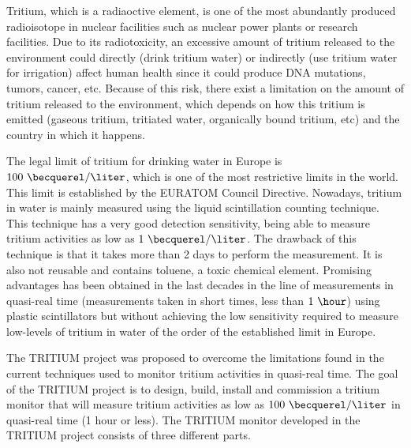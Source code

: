 Tritium, which is a radiaoctive element, is one of the most abundantly produced radioisotope in nuclear facilities such as nuclear power plants or research facilities. Due to its radiotoxicity, an excessive amount of tritium released to the environment could directly (drink tritium water) or indirectly (use tritium water for irrigation) affect human health since it could produce DNA mutations, tumors, cancer, etc. Because of this risk, there exist a limitation on the amount of tritium released to the environment, which depends on how this tritium is emitted (gaseous tritium, tritiated water, organically bound tritium, etc) and the country in which it happens.

The legal limit of tritium for drinking water in Europe is $100~\becquerel/\liter$, which is one of the most restrictive limits in the world. This limit is established by the EURATOM Council Directive. Nowadays, tritium in water is mainly measured using the liquid scintillation counting technique. This technique has a very good detection sensitivity, being able to measure tritium activities as low as $1~\becquerel/\liter$. The drawback of this technique is that it takes more than 2 days to perform the measurement. It is also not reusable and contains toluene, a toxic chemical element. Promising advantages has been obtained in the last decades in the line of measurements in quasi-real time (measurements taken in short times, less than $1~\hour$) using plastic scintillators but without achieving the low sensitivity required to measure low-levels of tritium in water of the order of the established limit in Europe.

The TRITIUM project was proposed to overcome the limitations found in the current techniques used to monitor tritium activities in quasi-real time. The goal of the TRITIUM project is to design, build, install and commission a tritium monitor that will measure tritium activities as low as $100~\becquerel/\liter$  in quasi-real time (1 hour or less). The TRITIUM monitor developed in the TRITIUM project consists of three different parts.

